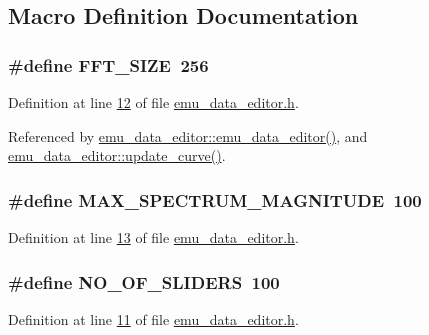 \subsection{Macro Definition Documentation}
\hypertarget{a00094_a636ddc19af00bc87969a07c88331f105}{
\subsubsection[{F\+F\+T\+\_\+\+S\+I\+Z\+E}]{\setlength{\rightskip}{0pt plus 5cm}\#define F\+F\+T\+\_\+\+S\+I\+Z\+E~256}}\label{a00094_a636ddc19af00bc87969a07c88331f105}


Definition at line \hyperlink{a00094_source_l00012}{12} of file \hyperlink{a00094_source}{emu\+\_\+data\+\_\+editor.\+h}.



Referenced by \hyperlink{a00093_source_l00012}{emu\+\_\+data\+\_\+editor\+::emu\+\_\+data\+\_\+editor()}, and \hyperlink{a00093_source_l00284}{emu\+\_\+data\+\_\+editor\+::update\+\_\+curve()}.

\hypertarget{a00094_a60ece807960441ee99b05b2e536cad76}{
\subsubsection[{M\+A\+X\+\_\+\+S\+P\+E\+C\+T\+R\+U\+M\+\_\+\+M\+A\+G\+N\+I\+T\+U\+D\+E}]{\setlength{\rightskip}{0pt plus 5cm}\#define M\+A\+X\+\_\+\+S\+P\+E\+C\+T\+R\+U\+M\+\_\+\+M\+A\+G\+N\+I\+T\+U\+D\+E~100}}\label{a00094_a60ece807960441ee99b05b2e536cad76}


Definition at line \hyperlink{a00094_source_l00013}{13} of file \hyperlink{a00094_source}{emu\+\_\+data\+\_\+editor.\+h}.

\hypertarget{a00094_a958de936b60eb9d784cdb10be7d39373}{
\subsubsection[{N\+O\+\_\+\+O\+F\+\_\+\+S\+L\+I\+D\+E\+R\+S}]{\setlength{\rightskip}{0pt plus 5cm}\#define N\+O\+\_\+\+O\+F\+\_\+\+S\+L\+I\+D\+E\+R\+S~100}}\label{a00094_a958de936b60eb9d784cdb10be7d39373}


Definition at line \hyperlink{a00094_source_l00011}{11} of file \hyperlink{a00094_source}{emu\+\_\+data\+\_\+editor.\+h}.

